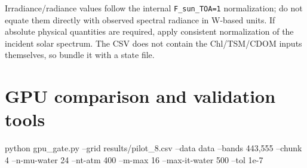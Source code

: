 Irradiance/radiance values follow the internal \texttt{F\_\allowbreak{}sun\_\allowbreak{}TOA=\allowbreak{}1} normalization; do not equate them directly with observed spectral radiance in W-based units. If absolute physical quantities are required, apply consistent normalization of the incident solar spectrum. The CSV does not contain the Chl/TSM/CDOM inputs themselves, so bundle it with a state file.

\section{GPU comparison and validation tools}
\label{sec:auto:06_python_batch:9}

\begin{ManualCode}
python gpu_gate.py --grid results/pilot_8.csv --data data --bands 443,555 --chunk 4 --n-mu-water 24 --nt-atm 400 --m-max 16 --max-it-water 500 --tol 1e-7
\end{ManualCode}


